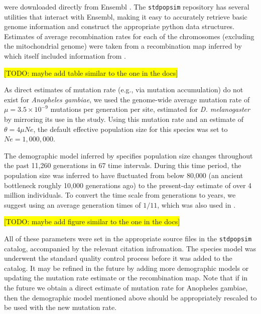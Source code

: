 \documentclass[hidelinks]{article}
\newcommand{\stdpopsim}{\texttt{stdpopsim}\xspace}
\begin{document}
were downloaded directly from Ensembl \citep{ensembl2021}.
The \stdpopsim repository has several utilities that interact with Ensembl, 
making it easy to accurately retrieve basic genome information and construct the appropriate python data structures.
Estimates of average recombination rates for each of the chromosomes (excluding the mitochondrial genome) 
were taken from a recombination map inferred by \cite{Pombi2006} which itself included information from
\citep{zheng1996integrated}.


\colorbox{yellow}{[TODO:  maybe add table similar to the one in the docs]} 

As direct estimates of mutation rate (e.g., via mutation accumulation) do not exist for \emph{Anopheles gambiae},
we used the genome-wide average mutation rate of $\mu=3.5 \times 10^{-9}$ mutations per generation per site,
estimated for \emph{D. melanogaster} by \cite{Keightley2009} mirroring its use in the \cite{Miles2017} study.
Using this mutation rate and an estimate of $\theta=4\mu Ne$, the default effective population size 
for this species was set to $Ne=1,000,000$.

The demographic model inferred by \cite{Miles2017} specifies
population size changes throughout the past 11,260 generations in 67 time intervals. 
During this time period, the population size was inferred to have fluctuated from below 80,000
(an ancient bottleneck roughly 10,000 generations ago) to the present-day estimate of over 4 million individuals.
To convert the time scale from generations to years, we suggest using an average generation times of $1/11$,
which was also used in \citep{Miles2017}.

\colorbox{yellow}{[TODO:  maybe add figure similar to the one in the docs]} 



All of these parameters were set in the appropriate source files in the \stdpopsim catalog,
accompanied by the relevant citation infromation.
The species model was underwent the standard quality control process before it was added to the catalog.
It may be refined in the future by adding more demographic models or updating the mutation rate estimate
or the recombination map. Note that if in the future we obtain a direct estimate of mutation rate for
Anopheles gambiae, then the demographic model mentioned above should be appropriately rescaled to be
used with the new mutation rate.
\end{document}

